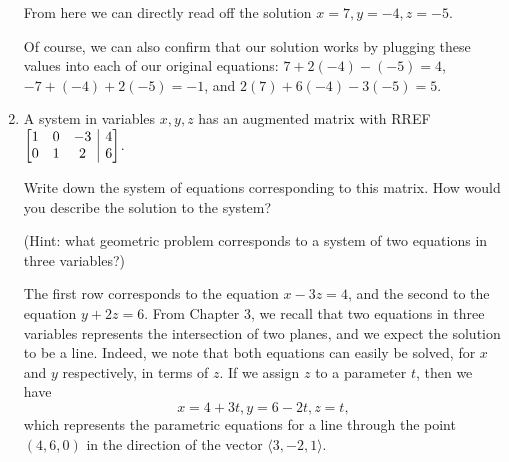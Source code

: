 \documentclass[12pt]{article}
\makeatletter
\newenvironment{amatrix}[1]{%
  \left[\begin{array}{@{}*{#1}{c}|c@{}}
}{%
  \end{array}\right]
}
\newcommand{\di}{\displaystyle}
\newcommand{\bam}{\begin{amatrix}}
\newcommand{\eam}{\end{amatrix}}
\makeatother
\begin{document}
\begin{enumerate}
From here we can directly read off the solution $x=7, y=-4, z=-5$.

Of course, we can also confirm that our solution works by plugging these values into each of our original equations: $7+2(-4)-(-5)=4$, $-7+(-4)+2(-5)=-1$, and $2(7)+6(-4)-3(-5) = 5$.

\bigskip


\item A system in variables $x,y,z$ has an augmented matrix with RREF $\di \bam{3} 1&0&-3&4\\0&1&2&6\eam$.

Write down the system of equations corresponding to this matrix. How would you describe the solution to the system?

(Hint: what geometric problem corresponds to a system of two equations in three variables?)

The first row corresponds to the equation $x-3z=4$, and the second to the equation $y+2z=6$. From Chapter 3, we recall that two equations in three variables represents the intersection of two planes, and we expect the solution to be a line. Indeed, we note that both equations can easily be solved, for $x$ and $y$ respectively, in terms of $z$. If we assign $z$ to a parameter $t$, then we have
\[
x=4+3t, y=6-2t, z=t,
\]
which represents the parametric equations for a line through the point $(4,6,0)$ in the direction of the vector $\langle 3,-2,1\rangle$.

 \end{enumerate}
  
\end{document}
